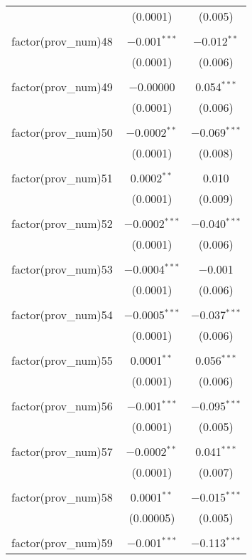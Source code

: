 \begin{table}[ht!]
\begin{tabular}{@{\extracolsep{5pt}}lcc}
  & (0.0001) & (0.005) \\ 
  & & \\ 
 factor(prov\_num)48 & $-$0.001$^{***}$ & $-$0.012$^{**}$ \\ 
  & (0.0001) & (0.006) \\ 
  & & \\ 
 factor(prov\_num)49 & $-$0.00000 & 0.054$^{***}$ \\ 
  & (0.0001) & (0.006) \\ 
  & & \\ 
 factor(prov\_num)50 & $-$0.0002$^{**}$ & $-$0.069$^{***}$ \\ 
  & (0.0001) & (0.008) \\ 
  & & \\ 
 factor(prov\_num)51 & 0.0002$^{**}$ & 0.010 \\ 
  & (0.0001) & (0.009) \\ 
  & & \\ 
 factor(prov\_num)52 & $-$0.0002$^{***}$ & $-$0.040$^{***}$ \\ 
  & (0.0001) & (0.006) \\ 
  & & \\ 
 factor(prov\_num)53 & $-$0.0004$^{***}$ & $-$0.001 \\ 
  & (0.0001) & (0.006) \\ 
  & & \\ 
 factor(prov\_num)54 & $-$0.0005$^{***}$ & $-$0.037$^{***}$ \\ 
  & (0.0001) & (0.006) \\ 
  & & \\ 
 factor(prov\_num)55 & 0.0001$^{**}$ & 0.056$^{***}$ \\ 
  & (0.0001) & (0.006) \\ 
  & & \\ 
 factor(prov\_num)56 & $-$0.001$^{***}$ & $-$0.095$^{***}$ \\ 
  & (0.0001) & (0.005) \\ 
  & & \\ 
 factor(prov\_num)57 & $-$0.0002$^{**}$ & 0.041$^{***}$ \\ 
  & (0.0001) & (0.007) \\ 
  & & \\ 
 factor(prov\_num)58 & 0.0001$^{**}$ & $-$0.015$^{***}$ \\ 
  & (0.00005) & (0.005) \\ 
  & & \\ 
 factor(prov\_num)59 & $-$0.001$^{***}$ & $-$0.113$^{***}$ \\ 

\end{tabular}
\end{table}

